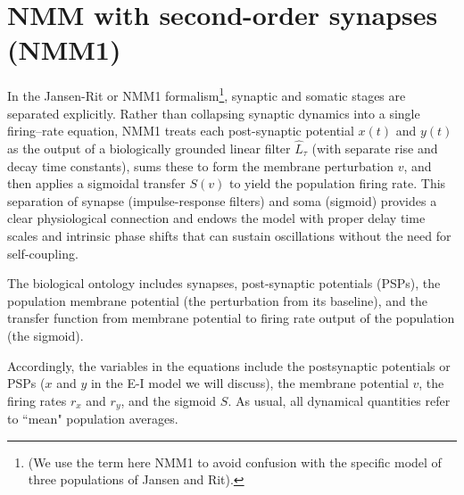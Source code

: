 \documentclass[12pt]{article}
\numberwithin{equation}{section}
\begin{document}
\section{NMM with second-order synapses (NMM1)} \label{sec:NMM1}
\begin{tcolorbox}[colback=gray!6,colframe=gray!6,enlarge left by=0mm, boxrule=0pt, enhanced, sharp corners]
In the Jansen-Rit or NMM1 formalism\footnote{(We use the term here NMM1 to avoid confusion with the specific model of three populations of Jansen and Rit).}, synaptic and somatic stages are separated explicitly.  Rather than collapsing synaptic dynamics into a single firing–rate equation, NMM1 treats each post-synaptic potential $x(t)$ and $y(t)$ as the output of a biologically grounded linear filter $\hat L_{\tau}$ (with separate rise and decay time constants), sums these to form the membrane perturbation $v$, and then applies a sigmoidal transfer $S(v)$ to yield the population firing rate.  This separation of synapse (impulse-response filters) and soma (sigmoid) provides a clear physiological connection and endows the model with proper delay time scales and intrinsic phase shifts that can sustain oscillations without the need for self-coupling.

 The biological ontology includes synapses, post-synaptic potentials (PSPs), the population membrane potential (the perturbation from its baseline), and the transfer function from membrane potential to firing rate output of the population (the sigmoid).


Accordingly, the variables in the equations include the postsynaptic potentials or PSPs ($x$ and $y$ in the E-I model we will discuss), the membrane potential $v$, the firing rates $r_x$ and $r_y$, and the sigmoid $S$.  As usual, all dynamical quantities refer to  ``mean" population averages. 
\end{tcolorbox}
\end{document}
